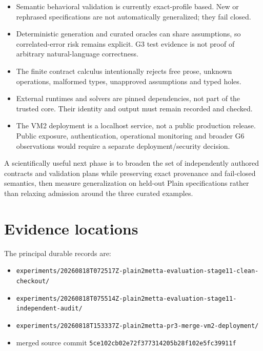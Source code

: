 \documentclass[11pt]{article}
\newcommand{\code}[1]{\texttt{#1}}
\begin{document}
\begin{itemize}
\item Semantic behavioral validation is currently exact-profile based.  New or
rephrased specifications are not automatically generalized; they fail closed.
\item Deterministic generation and curated oracles can share assumptions, so
correlated-error risk remains explicit.  G3 test evidence is not proof of
arbitrary natural-language correctness.
\item The finite contract calculus intentionally rejects free prose, unknown
operations, malformed types, unapproved assumptions and typed holes.
\item External runtimes and solvers are pinned dependencies, not part of the
trusted core.  Their identity and output must remain recorded and checked.
\item The VM2 deployment is a localhost service, not a public production
release.  Public exposure, authentication, operational monitoring and broader
G6 observations would require a separate deployment/security decision.
\end{itemize}

A scientifically useful next phase is to broaden the set of independently
authored contracts and validation plans while preserving exact provenance and
fail-closed semantics, then measure generalization on held-out Plain
specifications rather than relaxing admission around the three curated
examples.

\section{Evidence locations}

The principal durable records are:

\begin{itemize}
\item \code{experiments/20260818T072517Z-plain2metta-evaluation-stage11-clean-checkout/}
\item \code{experiments/20260818T075514Z-plain2metta-evaluation-stage11-independent-audit/}
\item \code{experiments/20260818T153337Z-plain2metta-pr3-merge-vm2-deployment/}
\item merged source commit \code{5ce102cb02e72f377314205b28f102e5fc39911f}
\end{itemize}
\end{document}
